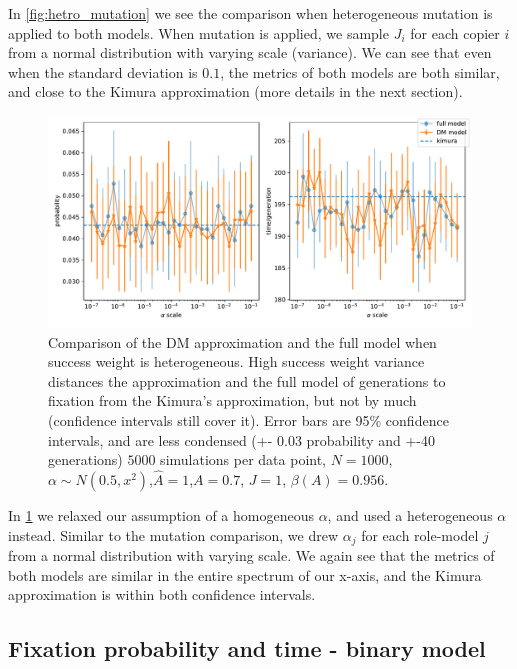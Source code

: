 \documentclass[12pt]{extarticle}
\begin{document}
In \cref{fig:hetro_mutation} we see the comparison when heterogeneous mutation is applied to both models. When mutation is applied, we sample $J_i$ for each copier $i$ from a normal distribution with varying scale (variance).
We can see that even when the standard deviation is $0.1$, the metrics of both models are both similar, and close to the Kimura approximation (more details in the next section). 

\begin{figure}
    \includegraphics[width=\linewidth]{../figures/binary/full_vs_dm_changing_alpha.pdf}
  \caption{Comparison of the DM approximation and the full model when success weight is heterogeneous. High success weight variance distances the approximation and the full model of generations to fixation from the Kimura's approximation, but not by much (confidence intervals still cover it). Error bars are 95\% confidence intervals, and are less condensed (+- 0.03 probability and +-40 generations)
  $5000$ simulations per data point, $N=1000$, $\alpha\sim N(0.5,x^2)$,$\hat{A}=1$,$A=0.7$, $J=1$, $\beta(A)=0.956$.}	
  \label{fig:hetro_alpha}
\end{figure}

In \cref{fig:hetro_alpha} we relaxed our assumption of a homogeneous $\alpha$, and used a heterogeneous $\alpha$ instead. Similar to the mutation comparison, we drew $\alpha_j$ for each role-model $j$ from a normal distribution with varying scale. We again see that the metrics of both models are similar in the entire spectrum of our x-axis, and the Kimura approximation is within both confidence intervals.

\subsection*{Fixation probability and time - binary model}
\end{document}
